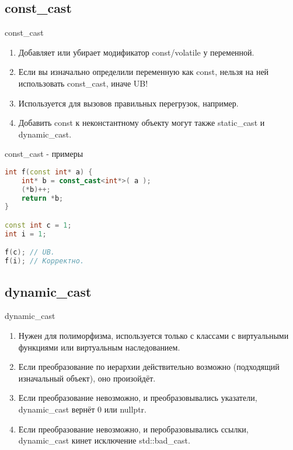 \documentclass[10pt]{beamer}
\begin{document}
\subsection{const\_cast}
\begin{frame}[fragile]{const\_cast}
\begin{enumerate}
    \item Добавляет или убирает модификатор const/volatile у переменной.
    \item Если вы изначально определили переменную как const, нельзя на ней использовать const\_cast, иначе UB!
    \item Используется для вызовов правильных перегрузок, например.
    \item Добавить const к неконстантному объекту могут также static\_cast и dynamic\_cast.
\end{enumerate}
\end{frame}

\begin{frame}[fragile]{const\_cast - примеры}
\begin{lstlisting}[language=C++]
int f(const int* a) {
    int* b = const_cast<int*>( a );
    (*b)++;
    return *b;
}

const int c = 1;
int i = 1;

f(c); // UB.
f(i); // Корректно.
\end{lstlisting}
\end{frame}

\subsection{dynamic\_cast}
\begin{frame}[fragile]{dynamic\_cast}
\begin{enumerate}
    \item Нужен для полиморфизма, используется только с классами с виртуальными функциями или виртуальным наследованием.
    \item Если преобразование по иерархии действительно возможно (подходящий изначальный объект), оно произойдёт.
    \item Если преобразование невозможно, и преобразовывались указатели, dynamic\_cast вернёт 0 или nullptr.
    \item Если преобразование невозможно, и перобразовывались ссылки, dynamic\_cast кинет исключение std::bad\_cast.
\end{enumerate}
\end{frame}
\end{document}
